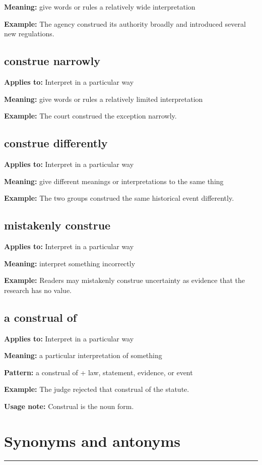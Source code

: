 \documentclass[11pt]{article}
\newcommand{\sectionrule}{\par\vspace{-0.5em}\noindent\textcolor{Accent}{\rule{\linewidth}{0.6pt}}\par}
\begin{document}
\textbf{Meaning:} give words or rules a relatively wide interpretation

\textbf{Example:} The agency construed its authority broadly and introduced several new regulations.

\subsection{construe narrowly}
\textbf{Applies to:} Interpret in a particular way

\textbf{Meaning:} give words or rules a relatively limited interpretation

\textbf{Example:} The court construed the exception narrowly.

\subsection{construe differently}
\textbf{Applies to:} Interpret in a particular way

\textbf{Meaning:} give different meanings or interpretations to the same thing

\textbf{Example:} The two groups construed the same historical event differently.

\subsection{mistakenly construe}
\textbf{Applies to:} Interpret in a particular way

\textbf{Meaning:} interpret something incorrectly

\textbf{Example:} Readers may mistakenly construe uncertainty as evidence that the research has no value.

\subsection{a construal of}
\textbf{Applies to:} Interpret in a particular way

\textbf{Meaning:} a particular interpretation of something

\textbf{Pattern:} a construal of + law, statement, evidence, or event

\textbf{Example:} The judge rejected that construal of the statute.

\textbf{Usage note:} Construal is the noun form.

\section{Synonyms and antonyms}
\sectionrule
\end{document}
